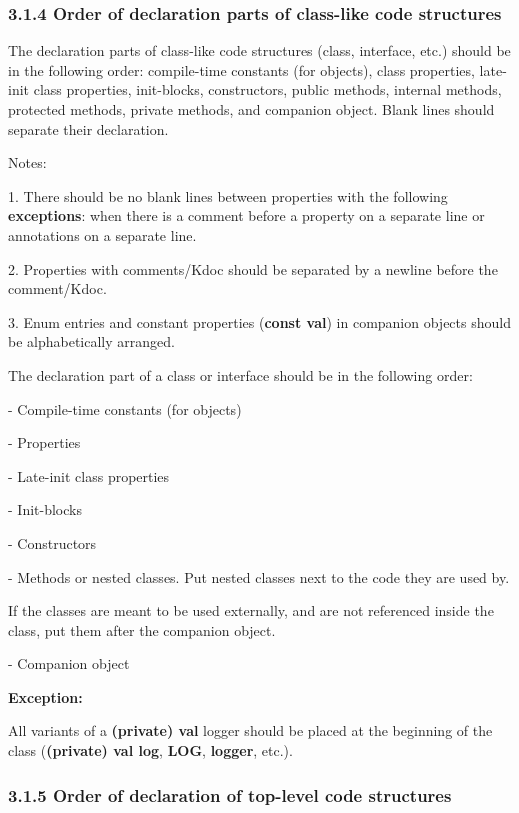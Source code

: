 \subsubsection*{\textbf{3.1.4 Order of declaration parts of class-like code structures}}
\leavevmode\newline

\label{sec:3.1.4}

The declaration parts of class-like code structures (class, interface, etc.) should be in the following order: compile-time constants (for objects), class properties, late-init class properties, init-blocks, constructors, public methods, internal methods, protected methods, private methods, and companion object. Blank lines should separate their declaration.

Notes:

1.	There should be no blank lines between properties with the following \textbf{exceptions}: when there is a comment before a property on a separate line or annotations on a separate line.

2.	Properties with comments/Kdoc should be separated by a newline before the comment/Kdoc.

3.	Enum entries and constant properties (\textbf{const val}) in companion objects should be alphabetically arranged.



The declaration part of a class or interface should be in the following order:

- Compile-time constants (for objects)

- Properties

- Late-init class properties

- Init-blocks

- Constructors

- Methods or nested classes. Put nested classes next to the code they are used by.

If the classes are meant to be used externally, and are not referenced inside the class, put them after the companion object.

- Companion object



\textbf{Exception:}

All variants of a \textbf{(private) val} logger should be placed at the beginning of the class (\textbf{(private) val log}, \textbf{LOG}, \textbf{logger}, etc.).



\subsubsection*{\textbf{3.1.5 Order of declaration of top-level code structures}}
\leavevmode\newline

